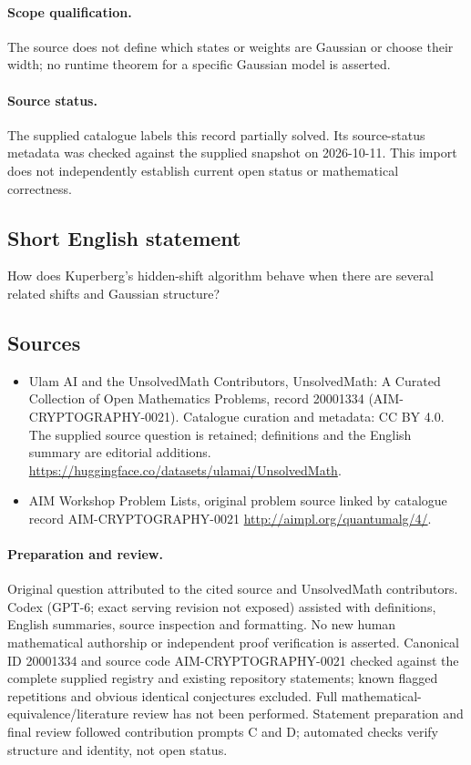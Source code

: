 \documentclass[11pt]{article}
\begin{document}
\paragraph{Scope qualification.}
The source does not define which states or weights are Gaussian or choose their width; no runtime theorem for a specific Gaussian model is asserted.
\paragraph{Source status.}
The supplied catalogue labels this record partially solved. Its source-status metadata was checked against the supplied snapshot on 2026-10-11. This import does not independently establish current open status or mathematical correctness.
\subsection{Short English statement}
How does Kuperberg's hidden-shift algorithm behave when there are several related shifts and Gaussian structure?
\subsection{Sources}
\begin{itemize}
\item[S1] Ulam AI and the UnsolvedMath Contributors, UnsolvedMath: A Curated Collection of Open Mathematics Problems, record 20001334 (AIM-CRYPTOGRAPHY-0021). Catalogue curation and metadata: CC BY 4.0. The supplied source question is retained; definitions and the English summary are editorial additions.
\url{https://huggingface.co/datasets/ulamai/UnsolvedMath}.
\item[S2] AIM Workshop Problem Lists, original problem source linked by catalogue record AIM-CRYPTOGRAPHY-0021
\url{http://aimpl.org/quantumalg/4/}.
\end{itemize}
\paragraph{Preparation and review.}
Original question attributed to the cited source and UnsolvedMath contributors. Codex (GPT-6; exact serving revision not exposed) assisted with definitions, English summaries, source inspection and formatting. No new human mathematical authorship or independent proof verification is asserted. Canonical ID 20001334 and source code AIM-CRYPTOGRAPHY-0021 checked against the complete supplied registry and existing repository statements; known flagged repetitions and obvious identical conjectures excluded. Full mathematical-equivalence/literature review has not been performed. Statement preparation and final review followed contribution prompts C and D; automated checks verify structure and identity, not open status.
\label{end:20001334}
\end{document}
